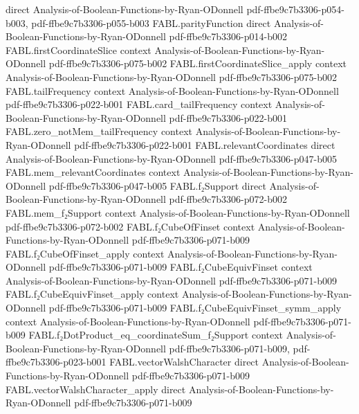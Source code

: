 \begin{theorem}
  {direct}
  {Analysis-of-Boolean-Functions-by-Ryan-ODonnell}
  {pdf-ffbe9c7b3306-p054-b003,
    pdf-ffbe9c7b3306-p055-b003}
\proofstep
  {FABL.parityFunction}
  {direct}
  {Analysis-of-Boolean-Functions-by-Ryan-ODonnell}
  {pdf-ffbe9c7b3306-p014-b002}
\proofstep
  {FABL.firstCoordinateSlice}
  {context}
  {Analysis-of-Boolean-Functions-by-Ryan-ODonnell}
  {pdf-ffbe9c7b3306-p075-b002}
\proofstep
  {FABL.firstCoordinateSlice_apply}
  {context}
  {Analysis-of-Boolean-Functions-by-Ryan-ODonnell}
  {pdf-ffbe9c7b3306-p075-b002}
\proofstep
  {FABL.tailFrequency}
  {context}
  {Analysis-of-Boolean-Functions-by-Ryan-ODonnell}
  {pdf-ffbe9c7b3306-p022-b001}
\proofstep
  {FABL.card_tailFrequency}
  {context}
  {Analysis-of-Boolean-Functions-by-Ryan-ODonnell}
  {pdf-ffbe9c7b3306-p022-b001}
\proofstep
  {FABL.zero_notMem_tailFrequency}
  {context}
  {Analysis-of-Boolean-Functions-by-Ryan-ODonnell}
  {pdf-ffbe9c7b3306-p022-b001}
\proofstep
  {FABL.relevantCoordinates}
  {direct}
  {Analysis-of-Boolean-Functions-by-Ryan-ODonnell}
  {pdf-ffbe9c7b3306-p047-b005}
\proofstep
  {FABL.mem_relevantCoordinates}
  {context}
  {Analysis-of-Boolean-Functions-by-Ryan-ODonnell}
  {pdf-ffbe9c7b3306-p047-b005}
\proofstep
  {FABL.f₂Support}
  {direct}
  {Analysis-of-Boolean-Functions-by-Ryan-ODonnell}
  {pdf-ffbe9c7b3306-p072-b002}
\proofstep
  {FABL.mem_f₂Support}
  {context}
  {Analysis-of-Boolean-Functions-by-Ryan-ODonnell}
  {pdf-ffbe9c7b3306-p072-b002}
\proofstep
  {FABL.f₂CubeOfFinset}
  {context}
  {Analysis-of-Boolean-Functions-by-Ryan-ODonnell}
  {pdf-ffbe9c7b3306-p071-b009}
\proofstep
  {FABL.f₂CubeOfFinset_apply}
  {context}
  {Analysis-of-Boolean-Functions-by-Ryan-ODonnell}
  {pdf-ffbe9c7b3306-p071-b009}
\proofstep
  {FABL.f₂CubeEquivFinset}
  {context}
  {Analysis-of-Boolean-Functions-by-Ryan-ODonnell}
  {pdf-ffbe9c7b3306-p071-b009}
\proofstep
  {FABL.f₂CubeEquivFinset_apply}
  {context}
  {Analysis-of-Boolean-Functions-by-Ryan-ODonnell}
  {pdf-ffbe9c7b3306-p071-b009}
\proofstep
  {FABL.f₂CubeEquivFinset_symm_apply}
  {context}
  {Analysis-of-Boolean-Functions-by-Ryan-ODonnell}
  {pdf-ffbe9c7b3306-p071-b009}
\proofstep
  {FABL.f₂DotProduct_eq_coordinateSum_f₂Support}
  {context}
  {Analysis-of-Boolean-Functions-by-Ryan-ODonnell}
  {pdf-ffbe9c7b3306-p071-b009,
    pdf-ffbe9c7b3306-p023-b001}
\proofstep
  {FABL.vectorWalshCharacter}
  {direct}
  {Analysis-of-Boolean-Functions-by-Ryan-ODonnell}
  {pdf-ffbe9c7b3306-p071-b009}
\proofstep
  {FABL.vectorWalshCharacter_apply}
  {direct}
  {Analysis-of-Boolean-Functions-by-Ryan-ODonnell}
  {pdf-ffbe9c7b3306-p071-b009}
\proofstep

\end{theorem}
